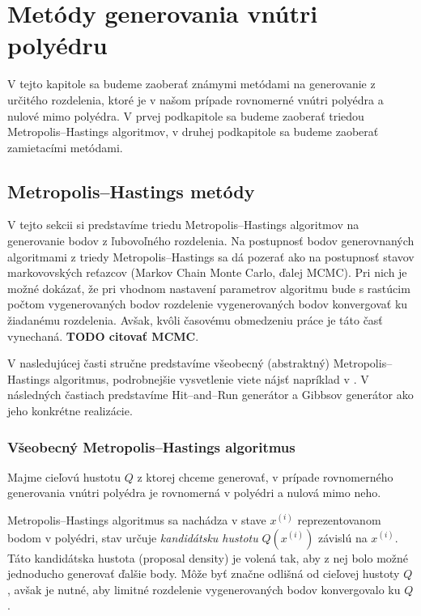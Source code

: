 \chapter{Metódy generovania vnútri polyédru}

V tejto kapitole sa budeme zaoberať známymi metódami na generovanie z určitého rozdelenia, ktoré je v našom prípade rovnomerné vnútri polyédra a nulové mimo polyédra. V prvej podkapitole sa budeme zaoberať triedou Metropolis--Hastings algoritmov, v druhej podkapitole sa budeme zaoberať zamietacími metódami.

\section{Metropolis--Hastings metódy}

V tejto sekcii si predstavíme triedu Metropolis--Hastings algoritmov na generovanie bodov z ľubovoľného rozdelenia. Na postupnosť bodov generovnaných algoritmami z triedy Metropolis--Hastings sa dá pozerať ako na postupnosť stavov markovovských reťazcov (Markov Chain Monte Carlo, ďalej MCMC). Pri nich je možné dokázať, že pri vhodnom nastavení parametrov algoritmu bude s rastúcim počtom vygenerovaných bodov rozdelenie vygenerovaných bodov konvergovať ku žiadanému rozdelenia. Avšak, kvôli časovému obmedzeniu práce je táto časť vynechaná. \textbf{TODO citovať MCMC}.

V nasledujúcej časti stručne predstavíme všeobecný (abstraktný) Metropolis--Hastings algoritmus, podrobnejšie vysvetlenie viete nájsť napríklad v \cite{metropolis-hastings_chib}. V následných častiach predstavíme Hit--and--Run generátor a Gibbsov generátor ako jeho konkrétne realizácie.

\subsection{Všeobecný Metropolis--Hastings algoritmus}

Majme cieľovú hustotu $Q$ z ktorej chceme generovať, v prípade rovnomerného generovania vnútri polyédra je rovnomerná v polyédri a nulová mimo neho.

Metropolis--Hastings algoritmus \cite{metropolis-hastings_chib} sa nachádza v stave $x^{(i)}$ reprezentovanom bodom v polyédri, stav určuje \textit{kandidátsku hustotu} $Q(x^{(i)})$ závislú na $x^{(i)}$. Táto kandidátska hustota (proposal density) je volená tak, aby z nej bolo možné jednoducho generovať ďalšie body. Môže byť značne odlišná od cieľovej hustoty $Q$, avšak je nutné, aby limitné rozdelenie vygenerovaných bodov konvergovalo ku $Q$.

